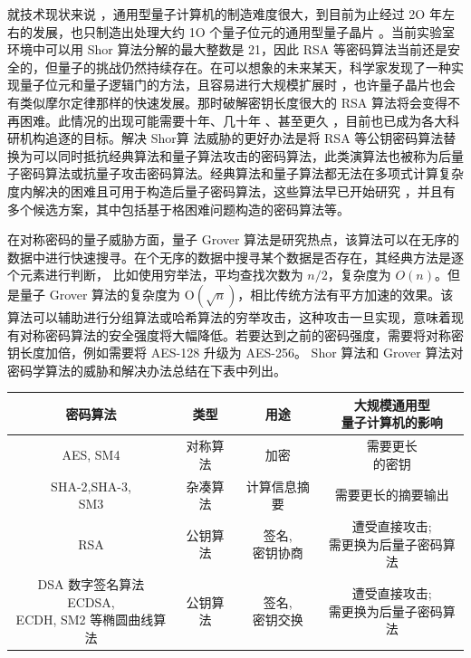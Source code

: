 就技术现状来说 ，通用型量子计算机的制造难度很大，到目前为止经过 2O 年左右的发展，也只制造出处理大约 1O 个量子位元的通用型量子晶片 。当前实验室环境中可以用 Shor 算法分解的最大整数是 21，因此 RSA 等密码算法当前还是安全的，但量子的挑战仍然持续存在。在可以想象的未来某天，科学家发现了一种实现量子位元和量子逻辑门的方法，且容易进行大规模扩展时 ，也许量子晶片也会有类似摩尔定律那样的快速发展。那时破解密钥长度很大的 RSA 算法将会变得不再困难。此情况的出现可能需要十年、几十年 、甚至更久 ，目前也已成为各大科研机构追逐的目标。解决 Shor算 法威胁的更好办法是将 RSA 等公钥密码算法替换为可以同时抵抗经典算法和量子算法攻击的密码算法，此类演算法也被称为后量子密码算法或抗量子攻击密码算法。经典算法和量子算法都无法在多项式计算复杂度内解决的困难且可用于构造后量子密码算法，这些算法早已开始研究 ，并且有多个候选方案，其中包括基于格困难问题构造的密码算法等。

在对称密码的量子威胁方面，量子 Grover 算法是研究热点，该算法可以在无序的数据中进行快速搜寻。在个无序的数据中搜寻某个数据是否存在，其经典方法是逐个元素进行判断， 比如使用穷举法，平均查找次数为 $ n / 2 $，复杂度为 $O(n)$。但是量子 Grover 算法的复杂度为 $\mathrm{O}(\sqrt{n})$，相比传统方法有平方加速的效果。该算法可以辅助进行分组算法或哈希算法的穷举攻击，这种攻击一旦实现，意味着现有对称密码算法的安全强度将大幅降低。若要达到之前的密码强度，需要将对称密钥长度加倍，例如需要将 AES-128 升级为 AES-256。 Shor 算法和 Grover 算法对密码学算法的威胁和解决办法总结在下表中列出。

\begin{center}
\begin{tabular}{cccc}
\hline
 密码算法 & 类型 & 用途 & \thead{大规模通用型\\量子计算机的影响} \\
\hline
 AES, SM4 & 对称算法 & 加密 & \thead{需要更长\\的密钥}\\
 \thead{SHA-2,SHA-3,\\SM3} & 杂凑算法 & 计算信息摘要 & 需要更长的摘要输出\\
 RSA & 公钥算法 & \thead{签名,\\密钥协商} & \thead{遭受直接攻击;\\需更换为后量子密码算法}\\
 \thead{DSA 数字签名算法 ECDSA,\\ECDH, SM2 等椭圆曲线算法} & 公钥算法 & \thead{签名,\\密钥交换} & \thead{遭受直接攻击;\\需更换为后量子密码算法}\\
\hline
\end{tabular}
\end{center}

